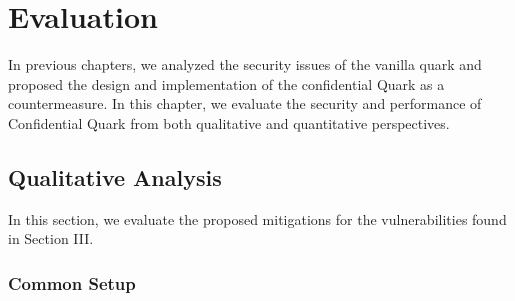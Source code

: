 \chapter{Evaluation}
\label{sec:evaluation}

In previous chapters, we analyzed the security issues of the vanilla quark and proposed the design and implementation of the confidential Quark as a countermeasure. In this chapter, we evaluate the security and performance of Confidential Quark from both 
qualitative and quantitative perspectives.

\section{Qualitative Analysis}
In this section, we evaluate the proposed mitigations for the vulnerabilities found in Section III.

\subsection{Common Setup}


